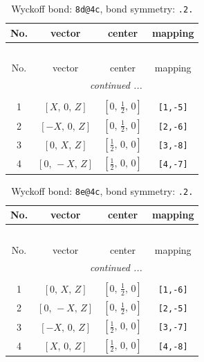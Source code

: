 \documentclass[fleqn,8pt]{jsarticle}
\begin{document}
\begin{longtable}{cccc}
\caption{Wyckoff bond: {\tt 8d@4c}, bond symmetry: {\tt .2.}}
 \\
 \hline \hline
No. & vector & center & mapping \\ \hline \endfirsthead

\multicolumn{3}{l}{\tablename\ \thetable{}} \\
 \hline \hline
No. & vector & center & mapping \\ \hline \endhead

 \hline \hline
\multicolumn{3}{r}{\footnotesize\it continued ...} \\ \endfoot

 \hline \hline
\multicolumn{3}{r}{} \\ \endlastfoot

1 & $\left[ X,\, 0,\, Z \right]$ & $\left[ 0,\, \frac{1}{2},\, 0 \right]$ & {\tt [1,-5]} \\ \hline
2 & $\left[ - X,\, 0,\, Z \right]$ & $\left[ 0,\, \frac{1}{2},\, 0 \right]$ & {\tt [2,-6]} \\ \hline
3 & $\left[ 0,\, X,\, Z \right]$ & $\left[ \frac{1}{2},\, 0,\, 0 \right]$ & {\tt [3,-8]} \\ \hline
4 & $\left[ 0,\, - X,\, Z \right]$ & $\left[ \frac{1}{2},\, 0,\, 0 \right]$ & {\tt [4,-7]} \\
\end{longtable}
\renewcommand{\arraystretch}{1.2}
\begin{longtable}{cccc}
\caption{Wyckoff bond: {\tt 8e@4c}, bond symmetry: {\tt .2.}}
 \\
 \hline \hline
No. & vector & center & mapping \\ \hline \endfirsthead

\multicolumn{3}{l}{\tablename\ \thetable{}} \\
 \hline \hline
No. & vector & center & mapping \\ \hline \endhead

 \hline \hline
\multicolumn{3}{r}{\footnotesize\it continued ...} \\ \endfoot

 \hline \hline
\multicolumn{3}{r}{} \\ \endlastfoot

1 & $\left[ 0,\, X,\, Z \right]$ & $\left[ 0,\, \frac{1}{2},\, 0 \right]$ & {\tt [1,-6]} \\ \hline
2 & $\left[ 0,\, - X,\, Z \right]$ & $\left[ 0,\, \frac{1}{2},\, 0 \right]$ & {\tt [2,-5]} \\ \hline
3 & $\left[ - X,\, 0,\, Z \right]$ & $\left[ \frac{1}{2},\, 0,\, 0 \right]$ & {\tt [3,-7]} \\ \hline
4 & $\left[ X,\, 0,\, Z \right]$ & $\left[ \frac{1}{2},\, 0,\, 0 \right]$ & {\tt [4,-8]} \\
\end{longtable}
\end{document}
